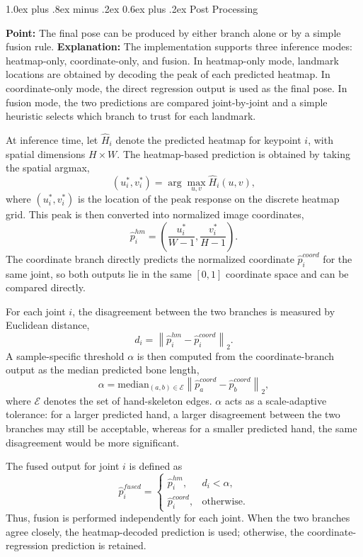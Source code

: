 \documentclass[10pt,letterpaper]{article}
\makeatletter
\renewcommand\subsection{\@startsection{subsection}{2}{\z@}%
  {1.0ex plus .8ex minus .2ex}%
  {0.6ex plus .2ex}%
  {\normalfont\itshape}}
\makeatother
\begin{document}
\subsection{Post Processing}

\noindent\textbf{Point:} The final pose can be produced by either branch alone or by a simple fusion rule.  
\textbf{Explanation:} The implementation supports three inference modes: heatmap-only, coordinate-only, and fusion. In heatmap-only mode, landmark locations are obtained by decoding the peak of each predicted heatmap. In coordinate-only mode, the direct regression output is used as the final pose. In fusion mode, the two predictions are compared joint-by-joint and a simple heuristic selects which branch to trust for each landmark.

At inference time, let \(\hat{H}_i\) denote the predicted heatmap for keypoint \(i\), with spatial dimensions \(H \times W\). The heatmap-based prediction is obtained by taking the spatial argmax,
\[
(u_i^*, v_i^*) = \arg\max_{u,v} \hat{H}_i(u,v),
\]
where \((u_i^*, v_i^*)\) is the location of the peak response on the discrete heatmap grid. This peak is then converted into normalized image coordinates,
\[
\hat{p}^{hm}_i =
\left(
\frac{u_i^*}{W-1},
\frac{v_i^*}{H-1}
\right).
\]
The coordinate branch directly predicts the normalized coordinate \(\hat{p}^{coord}_i\) for the same joint, so both outputs lie in the same \([0,1]\) coordinate space and can be compared directly.

For each joint \(i\), the disagreement between the two branches is measured by Euclidean distance,
\[
d_i = \left\| \hat{p}^{hm}_i - \hat{p}^{coord}_i \right\|_2.
\]
A sample-specific threshold \(\alpha\) is then computed from the coordinate-branch output as the median predicted bone length,
\[
\alpha = \mathrm{median}_{(a,b)\in \mathcal{E}}
\left\| \hat{p}^{coord}_a - \hat{p}^{coord}_b \right\|_2,
\]
where \(\mathcal{E}\) denotes the set of hand-skeleton edges. \(\alpha\) acts as a scale-adaptive tolerance: for a larger predicted hand, a larger disagreement between the two branches may still be acceptable, whereas for a smaller predicted hand, the same disagreement would be more significant.

The fused output for joint \(i\) is defined as
\[
\hat{p}^{fused}_i =
\begin{cases}
\hat{p}^{hm}_i, & d_i < \alpha, \\
\hat{p}^{coord}_i, & \text{otherwise.}
\end{cases}
\]
Thus, fusion is performed independently for each joint. When the two branches agree closely, the heatmap-decoded prediction is used; otherwise, the coordinate-regression prediction is retained.
\end{document}
